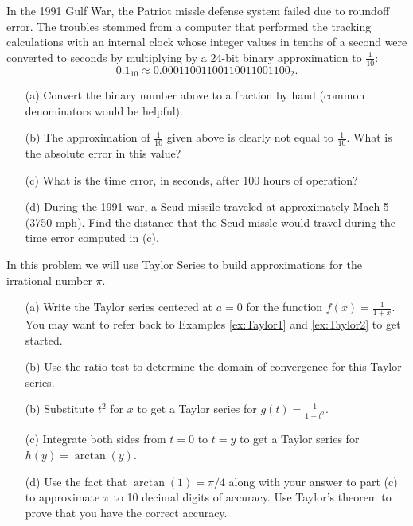

\begin{problem}
    In the 1991 Gulf War, the Patriot missle defense system failed due to roundoff error.
    The troubles stemmed from a computer that performed the tracking calculations with an
    internal clock whose integer values in tenths of a second were converted to seconds by
    multiplying by a 24-bit binary approximation to $\frac{1}{10}$:
    \[ 0.1_{10} \approx 0.00011001100110011001100_2. \]
    \begin{enumerate}
        \item[(a)] Convert the binary number above to a fraction by hand (common
            denominators would be helpful).
        \item[(b)] The approximation of $\frac{1}{10}$ given above is clearly not equal to
            $\frac{1}{10}$.  What is the absolute error in this value?
        \item[(c)] What is the time error, in seconds, after 100 hours of operation?
        \item[(d)] During the 1991 war, a Scud missile traveled at approximately Mach 5
            (3750 mph).  Find the distance that the Scud missle would travel during the
            time error computed in (c).
    \end{enumerate}
\end{problem}


\begin{problem}[Approximating $\pi$]
    In this problem we will use Taylor Series to build approximations for the irrational
    number $\pi$.
    \begin{enumerate}
        \item[(a)] Write the Taylor series centered at $a=0$ for the function $f(x) =
            \frac{1}{1+x}$.  You may want to refer back to Examples \ref{ex:Taylor1} and
            \ref{ex:Taylor2} to get started.
        \item[(b)] Use the ratio test to determine the domain of convergence for this
            Taylor series.
        \item[(b)] Substitute $t^2$ for $x$ to get a Taylor series for $g(t) =
            \frac{1}{1+t^2}$.
        \item[(c)] Integrate both sides from $t=0$ to $t=y$ to get a Taylor series for
            $h(y) = \arctan(y)$.
        \item[(d)] Use the fact that $\arctan(1) = \pi/4$ along with your answer
            to part (c) to approximate $\pi$ to 10 decimal digits of accuracy.  Use
            Taylor's theorem to prove that you have the correct accuracy.
    \end{enumerate}
\end{problem}

